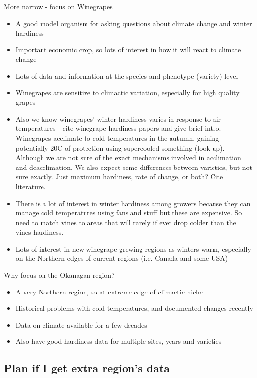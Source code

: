 \documentclass[11pt,letter]{article}
\begin{document}
More narrow - focus on Winegrapes
\begin{itemize}
  \item A good model organism for asking questions about climate change and winter hardiness
  \item Important economic crop, so lots of interest in how it will react to climate change
  \item Lots of data and information at the species and phenotype (variety) level 
  \item Winegrapes are sensitive to climactic variation, especially for high quality grapes 
  \item Also we know winegrapes' winter hardiness varies in response to air temperatures - cite winegrape hardiness papers and give brief intro. Winegrapes acclimate to cold temperatures in the autumn, gaining potentially 20\textdegree C of protection using supercooled something (look up). Although we are not sure of the exact mechanisms involved in acclimation and deacclimation. We also expect some differences between varieties, but not sure exactly. Just maximum hardiness, rate of change, or both? Cite literature. 
  \item There is a lot of interest in winter hardiness among growers because they can manage cold temperatures using fans and stuff but these are expensive. So need to match vines to areas that will rarely if ever drop colder than the vines hardiness.  
  \item Lots of interest in new winegrape growing regions as winters warm, especially on the Northern edges of current regions (i.e. Canada and some USA) 
\end{itemize}

Why focus on the Okanagan region?
\begin{itemize}
  \item A very Northern region, so at extreme edge of climactic niche
  \item Historical problems with cold temperatures, and documented changes recently 
  \item Data on climate available for a few decades
  \item Also have good hardiness data for multiple sites, years and varieties
\end{itemize}

\subsection{Plan if I get extra region's data}
\end{document}
